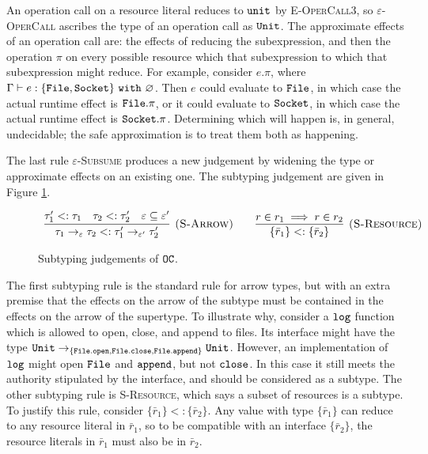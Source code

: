 An operation call on a resource literal reduces to $\mathtt{unit}$ by \textsc{E-OperCall3}, so \textsc{$\varepsilon$-OperCall} ascribes the type of an operation call as $\mathtt{Unit}$. The approximate effects of an operation call are: the effects of reducing the subexpression, and then the operation $\pi$ on every possible resource which that subexpression to which that subexpression might reduce. For example, consider $e.\pi$, where $\Gamma \vdash e: \{ \mathtt{File, Socket} \}~\mathtt{with}~ \varnothing$. Then $e$ could evaluate to $\mathtt{File}$, in which case the actual runtime effect is $\mathtt{File}.\pi$, or it could evaluate to $\mathtt{Socket}$, in which case the actual runtime effect is $\mathtt{Socket.\pi}$. Determining which will happen is, in general, undecidable; the safe approximation is to treat them both as happening.

The last rule \textsc{$\varepsilon$-Subsume} produces a new judgement by widening the type or approximate effects on an existing one. The subtyping judgement are given in Figure \ref{fig:opercalc_static_rules}.


\begin{figure}[h]
\vspace{-5pt}


\[
\begin{array}{c}

\infer[\textsc{(S-Arrow)}]
	{ \tau_1 \rightarrow_{\varepsilon} \tau_2 <: \tau_1' \rightarrow_{\varepsilon'} \tau_2' }
	{ \tau_1' <: \tau_1 & \tau_2 <: \tau_2' & \varepsilon \subseteq \varepsilon' }
~~~~~~
\infer[\textsc{(S-Resource)}]
	{ \{ \bar r_1 \} <: \{ \bar r_2 \} }
	{ r \in r_1 \implies r \in r_2 }

\end{array}
\]

\vspace{-7pt}
\caption{Subtyping judgements of $\mathtt{OC}$.}
\label{fig:opercalc_static_rules}
\end{figure}

The first subtyping rule is the standard rule for arrow types, but with an extra premise that the effects on the arrow of the subtype must be contained in the effects on the arrow of the supertype. To illustrate why, consider a $\mathtt{log}$ function which is allowed to open, close, and append to files. Its interface might have the type $\mathtt{Unit} \rightarrow_{\{\mathtt{File.open, File.close, File.append}\}} \mathtt{Unit}$. However, an implementation of $\mathtt{log}$ might open $\mathtt{File}$ and $\mathtt{append}$, but not $\mathtt{close}$. In this case it still meets the authority stipulated by the interface, and should be considered as a subtype. The other subtyping rule is \textsc{S-Resource}, which says a subset of resources is a subtype. To justify this rule, consider $\{ \bar r_1 \} <: \{ \bar r_2 \}$. Any value with type $\{ \bar r_1 \}$ can reduce to any resource literal in $\bar r_1$, so to be compatible with an interface $\{ \bar r_2 \}$, the resource literals in $\bar r_1$ must also be in $\bar r_2$.

